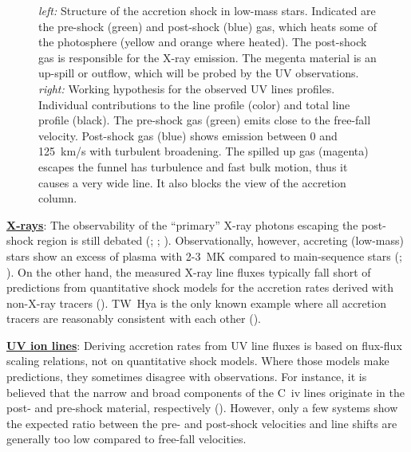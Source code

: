 \documentclass[letterpaper,11pt,twocolumn]{article}
\begin{document}
\begin{figure}
\centering
{}
\caption{\label{fig:CIVsketch} \emph{left:} Structure of the accretion
  shock in low-mass stars. Indicated are the pre-shock (green) and
  post-shock (blue) gas, which heats some of the photosphere (yellow
  and orange where heated). The post-shock gas is responsible for the
  X-ray emission. The megenta material is an up-spill or outflow,
  which will be probed by the UV observations.  
  \emph{right:}
  Working hypothesis for the observed UV lines profiles.
  Individual contributions to the line profile (color) and total line
  profile (black). 
  The pre-shock gas (green) emits close
  to the free-fall velocity. Post-shock gas (blue) shows
  emission between 0 and 125~km/s with turbulent broadening. The
  spilled up gas (magenta) escapes the funnel has turbulence and fast bulk
  motion, thus it causes a very wide line. It also blocks the view of
  the accretion column. 
  }
\end{figure}


\underline{\bf X-rays}: The observability of the ``primary'' X-ray photons 
escaping the post-shock region is still debated 
(; ; ). Observationally, 
however, accreting (low-mass) stars show  an excess of plasma with 2-3~MK
compared to main-sequence stars (; ).
On the other hand, the measured X-ray line fluxes typically fall short of
predictions from quantitative shock models for the accretion rates derived with non-X-ray tracers (). TW~Hya is the only known example where all accretion tracers are reasonably consistent with each other (). 


\underline{\bf UV ion lines}:  Deriving  accretion rates from UV line fluxes is based 
on flux-flux scaling relations, not on quantitative shock models. Where those models make predictions, they sometimes disagree with observations. For instance, it is believed that the  narrow and 
broad components of the C~{\sc iv} lines  originate in the post- and 
pre-shock material, respectively (). However, only a few systems show the
expected ratio between the pre- and post-shock velocities and line
shifts are generally too low compared to free-fall velocities. 
\end{document}
